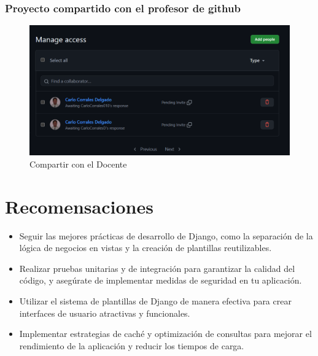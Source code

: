\documentclass{article}
\begin{document}
	\subsubsection{Proyecto compartido con el profesor de github}
  \begin{figure}[H]
    \centering
    \includegraphics[width=1\textwidth, keepaspectratio]{img/Compartir.png}
    \caption{Compartir con el Docente}
  \end{figure}
  \newpage
  

  \section{Recomensaciones}
  \begin{itemize}
  \item Seguir las mejores prácticas de desarrollo de Django, como la separación de la lógica de negocios en vistas y 
  la creación de plantillas reutilizables.
  \item Realizar pruebas unitarias y de integración para garantizar la calidad del código, y asegúrate de implementar 
  medidas de seguridad en tu aplicación.
  \item Utilizar el sistema de plantillas de Django de manera efectiva para crear interfaces de usuario atractivas y funcionales.
  \item Implementar estrategias de caché y optimización de consultas para mejorar el rendimiento de la aplicación y reducir los tiempos de carga.
  \end{itemize}

\end{document}
